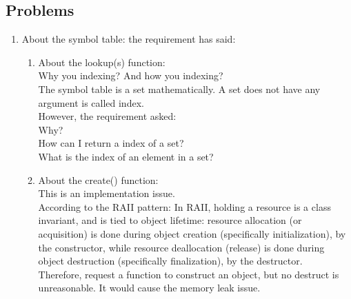 \documentclass[12pt,a4paper]{article}
\begin{document}
\begin{CJK}{UTF8}{bsmi}
    \section{Problems}
    \begin{enumerate}
        \item About the symbol table:
              the requirement has said:\\
              \begin{enumerate}
                  \item About the lookup(s) function:\\
                        Why you indexing? And how you indexing?\\
                        The symbol table is a set mathematically. A set does not have any argument is called
                        index.\\
                        However, the requirement asked:\\
                        Why?\\
                        How can I return a index of a set?\\
                        What is the index of an element in a set?
                  \item About the create() function:\\
                        This is an implementation issue.\\
                        According to the RAII pattern: In RAII, holding a resource is a
                        class invariant, and is tied to object lifetime: resource allocation
                        (or acquisition) is done during object creation (specifically
                        initialization), by the constructor, while resource deallocation
                        (release) is done during object destruction (specifically finalization),
                        by the destructor. \\
                        Therefore, request a function to construct an object, but no destruct
                        is unreasonable. It would cause the memory leak issue.


\end{enumerate}
\end{enumerate}
\end{CJK}
\end{document}
